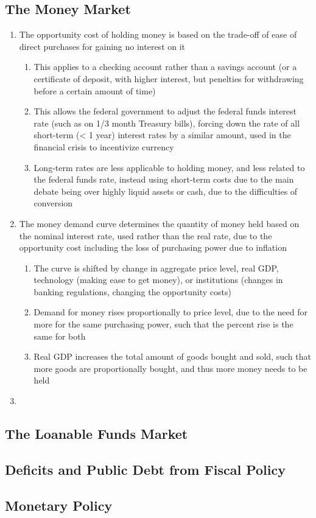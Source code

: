 \documentclass[11 pt, twoside]{article}
\begin{document}
\subsection{The Money Market}
\begin{enumerate}
\item The opportunity cost of holding money is based on the trade-off of ease of direct purchases for gaining no interest on it
\begin{enumerate}
\item This applies to a checking account rather than a savings account (or a certificate of deposit, with higher interest, but penelties for withdrawing before a certain amount of time)
\item This allows the federal government to adjust the federal funds interest rate (such as on 1/3 month Treasury bills), forcing down the rate of all short-term (< 1 year) interest rates by a similar amount, used in the financial crisis to incentivize currency
\item Long-term rates are less applicable to holding money, and less related to the federal funds rate, instead using short-term costs due to the main debate being over highly liquid assets or cash, due to the difficulties of conversion
\end{enumerate}
\item The money demand curve determines the quantity of money held based on the nominal interest rate, used rather than the real rate, due to the opportunity cost including the loss of purchasing power due to inflation
\begin{enumerate}
\item The curve is shifted by change in aggregate price level, real GDP, technology (making ease to get money), or institutions (changes in banking regulations, changing the opportunity costs)
\item Demand for money rises proportionally to price level, due to the need for more for the same purchasing power, such that the percent rise is the same for both
\item Real GDP increases the total amount of goods bought and sold, such that more goods are proportionally bought, and thus more money needs to be held
\end{enumerate}
\item 
\end{enumerate}

\subsection{The Loanable Funds Market}
\subsection{Deficits and Public Debt from Fiscal Policy}
\subsection{Monetary Policy}
\end{document}
